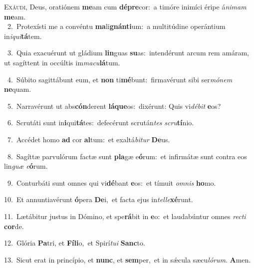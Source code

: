 \lettrine{\initial\textcolor{\initialcolor}{E}}{xáudi,} Deus, oratiónem \textbf{me}\-am cum \textbf{dé}\-\textbf{pre}cor:~\star a timóre inimíci éripe á\-\textit{ni}\-\textit{mam} \textbf{me}\-am.\\
{\numbfont\textcolor{\numbcolor}{~2.}}~Protexísti me a convéntu \textbf{ma}\-li\-\textbf{gnán}\-\textbf{ti}um:~\star a multitúdine operántium in\-\textit{i}\-\textit{qui}\textbf{tá}tem.\par
{\numbfont\textcolor{\numbcolor}{~3.}}~Quia exacuérunt ut gládium \textbf{lin}\-guas \textbf{su}\-as:~\star intendérunt arcum rem amáram, ut sagíttent in occúltis im\-\textit{ma}\-\textit{cu}\textbf{lá}tum.\par
{\numbfont\textcolor{\numbcolor}{~4.}}~Súbito sagittábunt eum, et \textbf{non} ti\-\textbf{mé}\-bunt:~\star firmavérunt sibi ser\-\textit{mó}\-\textit{nem} \textbf{ne}\-quam.\par
{\numbfont\textcolor{\numbcolor}{~5.}}~Narravérunt ut abs\-\textbf{cón}\-derent \textbf{lá}\-\textbf{que}os:~\star dixérunt: Quis vi\-\textit{dé}\-\textit{bit} \textbf{e}\-os?\par
{\numbfont\textcolor{\numbcolor}{~6.}}~Scrutáti sunt in\-\textbf{i}\-qui\-\textbf{tá}\-tes:~\star defecérunt scrután\textit{tes} \textit{scru}\-\textbf{tí}nio.\par
{\numbfont\textcolor{\numbcolor}{~7.}}~Accédet homo \textbf{ad} cor \textbf{al}\-tum:~\star et exaltá\-\textit{bi}\-\textit{tur} \textbf{De}\-us.\par
{\numbfont\textcolor{\numbcolor}{~8.}}~Sagíttæ parvulórum factæ sunt \textbf{pla}\-gæ e\-\textbf{ó}\-rum:~\star et infirmátæ sunt contra eos lin\textit{guæ} \textit{e}\-\textbf{ó}rum.\par
{\numbfont\textcolor{\numbcolor}{~9.}}~Conturbáti sunt omnes qui vi\-\textbf{dé}\-bant \textbf{e}\-os:~\star et tímuit \textit{om}\-\textit{nis} \textbf{ho}\-mo.\par
{\numbfont\textcolor{\numbcolor}{10.}}~Et annuntiavérunt \textbf{ó}\-pera \textbf{De}\-i,~\star et facta ejus in\-\textit{tel}\-\textit{le}\textbf{xé}runt.\par
{\numbfont\textcolor{\numbcolor}{11.}}~Lætábitur justus in Dómino, et spe\-\textbf{rá}\-bit in \textbf{e}\-o:~\star et laudabúntur omnes \textit{rec}\-\textit{ti} \textbf{cor}\-de.\par
{\numbfont\textcolor{\numbcolor}{12.}}~Glória \textbf{Pa}\-tri, et \textbf{Fí}\-\textbf{li}o,~\star et Spirí\-\textit{tu}\-\textit{i} \textbf{Sanc}\-to.\par
{\numbfont\textcolor{\numbcolor}{13.}}~Sicut erat in princípio, et \textbf{nunc}\-, et \textbf{sem}\-per,~\star et in sǽcula sæcu\-\textit{ló}\-\textit{rum}. \textbf{A}\-men.\par
